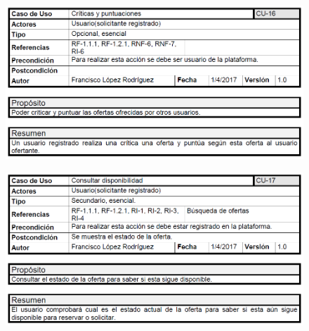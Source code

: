 	\begin{figure}[h!]
		\centering
		\includegraphics[width=0.9\linewidth]{img/casos/ofertas/criticas_y_puntuaciones}
		\label{fig:criticasypuntuaciones}
	\end{figure}
\clearpage
	\begin{figure}[h!]
		\centering
		\includegraphics[width=0.9\linewidth]{img/casos/ofertas/disponibilidad}
		\label{fig:criticasypuntuaciones}
	\end{figure}
	
